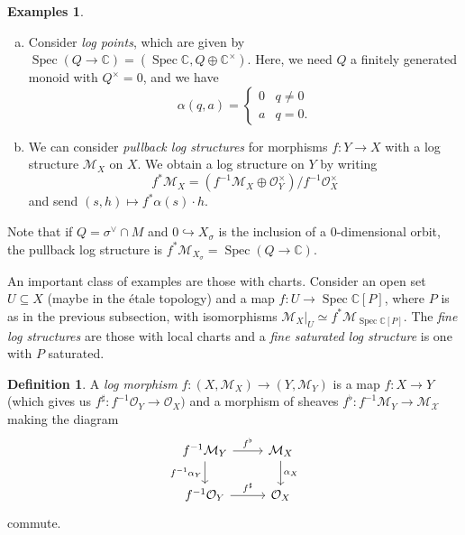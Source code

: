 \documentclass[leqno, openany]{memoir}
\theoremstyle{definition}
\newtheorem{defn}[thm]{Definition}
\newtheorem{exms}[thm]{Examples}
\theoremstyle{remark}
\theoremstyle{plain}
\theoremstyle{definition}
\theoremstyle{remark}
\newcommand{\C}{\mathbb{C}}
\newcommand{\mc}[1]{\mathcal{#1}}
\DeclareMathOperator{\Spec}{Spec}
\begin{document}
\begin{exms}\leavevmode
    \begin{enumerate}[(a)]
        \item Consider \textit{log points}, which are given by $\Spec(Q \to \C) = (\Spec \C, Q \oplus \C^{\times})$. Here, we need $Q$ a finitely generated monoid with $Q^{\times} = \qty{0}$, and we have
            \[ \alpha(q,a) = \begin{cases}
                0 & q \neq 0 \\
                a & q = 0.
            \end{cases}
            \]
        \item We can consider \textit{pullback log structures} for morphisms $f \colon Y \to X$ with a log structure $\mc{M}_X$ on $X$. We obtain a log structure on $Y$ by writing
            \[ f^* \mc{M}_X = (f^{-1} \mc{M}_X \oplus \mc{O}_Y^{\times}) / f^{-1} \mc{O}_X^{\times} \]
            and send $(s,h) \mapsto f^*\alpha(s) \cdot h$.
    \end{enumerate}
\end{exms}

Note that if $Q = \sigma^{\vee} \cap M$ and $0 \hookrightarrow X_{\sigma}$ is the inclusion of a $0$-dimensional orbit, the pullback log structure is $f^* \mc{M}_{X_{\sigma}} = \Spec(Q \to \C)$.

An important class of examples are those with charts. Consider an open set $U \subseteq X$ (maybe in the \'etale topology) and a map $f \colon U \to \Spec \C[P]$, where $P$ is as in the previous subsection, with isomorphisms $\mc{M}_X|_U \simeq f^* \mc{M}_{\Spec \C[P]}$. The \textit{fine log structures} are those with local charts and a \textit{fine saturated log structure} is one with $P$ saturated.

\begin{defn}
    A \textit{log morphism} $f \colon (X, \mc{M}_X) \to (Y, \mc{M}_Y)$ is a map $f \colon X \to Y$ (which gives us $f^{\sharp} \colon f^{-1}\mc{O}_Y \to \mc{O}_X)$ and a morphism of sheaves $f^{\flat} \colon f^{-1} \mc{M}_Y \to \mc{M_X}$ making the diagram
    \begin{equation*}
    \begin{tikzcd}
        f^{-1}\mc{M}_Y \ar{r}{f^{\flat}} \ar[swap]{d}{f^{-1}\alpha_Y} & \mc{M}_X \ar{d}{\alpha_X} \\
        f^{-1} \mc{O}_Y \ar{r}{f^{\sharp}} & \mc{O}_X
    \end{tikzcd}
    \end{equation*}
    commute.
\end{defn}
\end{document}

